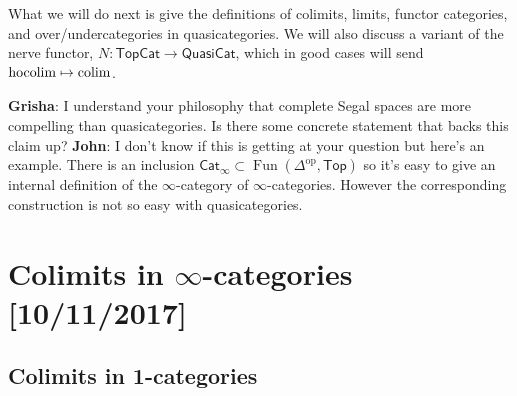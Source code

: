 \documentclass{amsart}
\DeclareMathOperator{\Fun}{Fun}
\DeclareMathOperator{\hocolim}{hocolim}
\begin{document}
What we will do next is give the definitions of colimits, limits, functor categories,
and over/undercategories in quasicategories. We will also discuss a variant of
the nerve functor, $N:\mathsf{TopCat}\to\mathsf{QuasiCat}$, which in good cases will
send $\hocolim\mapsto\colim$.

\textbf{Grisha}: I understand your philosophy that complete Segal spaces are
more compelling than quasicategories. Is there some concrete statement that backs
this claim up?
\textbf{John}: I don't know if this is getting at your question but here's an example.
There is an inclusion $\mathsf{Cat}_\infty\subset\Fun(\Delta^\text{op},\mathsf{Top})$
so it's easy to give an internal definition of the $\infty$-category of $\infty$-categories.
However the corresponding construction is not so easy with quasicategories.

\newpage


\section{Colimits in $\infty$-categories [10/11/2017]}

\subsection{Colimits in 1-categories}
\end{document}
